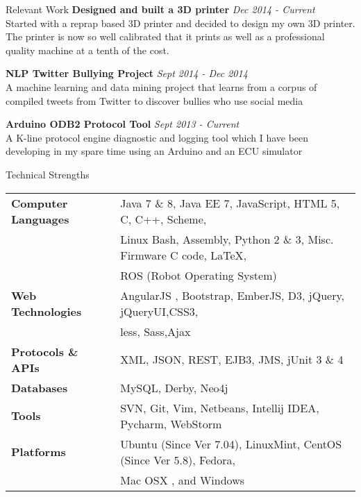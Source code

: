 \documentclass{resume} %
\begin{document}
\begin{rSection}{Relevant Work}
{\bf Designed and built a 3D printer} \hfill {\em Dec 2014 - Current} \\ 
Started with a reprap based 3D printer and decided to design my own 3D printer. The printer is now so well calibrated that it prints as well as a professional quality machine at a tenth of the cost.

{\bf NLP Twitter Bullying Project} \hfill {\em Sept 2014 - Dec 2014} \\ 
A machine learning and data mining project that learns from a corpus of compiled tweets from Twitter to discover bullies who use social media

{\bf Arduino ODB2 Protocol Tool} \hfill {\em Sept 2013 - Current} \\ 
A K-line protocol engine diagnostic and logging tool which I have been developing in my spare time using an Arduino and an ECU simulator  \smallskip \\

\end{rSection}



\begin{rSection}{Technical Strengths}

\begin{tabular}{ @{} >{\bfseries}l @{\hspace{6ex}} l }
Computer Languages & Java 7 \& 8, Java EE 7, JavaScript,  HTML 5, C, C++,  Scheme,\\
 					&  Linux Bash, Assembly, Python 2 \& 3, Misc. Firmware C code, \LaTeX,\\
 					&  ROS (Robot Operating System) \\
Web Technologies & AngularJS , Bootstrap, EmberJS, D3, jQuery, jQueryUI,CSS3,\\
				&  less, Sass,Ajax \\	
Protocols \& APIs & XML, JSON,  REST, EJB3, JMS, jUnit 3 \& 4 \\
         Databases & MySQL, Derby, Neo4j \\
			 Tools & SVN, Git, Vim, Netbeans, Intellij IDEA, Pycharm, WebStorm \\
		 Platforms & Ubuntu (Since Ver 7.04), LinuxMint, CentOS (Since Ver 5.8), Fedora, \\
 & Mac OSX , and Windows \\
\end{tabular}

\end{rSection}
\end{document}
